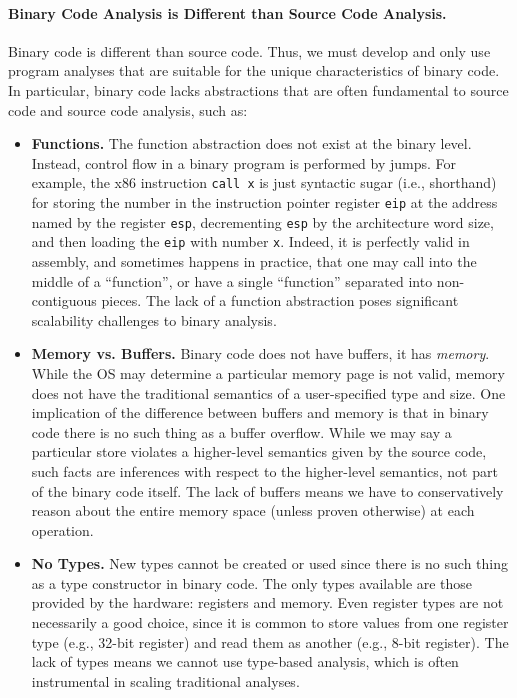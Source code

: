 \paragraph{Binary Code Analysis is Different than Source Code Analysis.}
Binary code is different than source code. Thus, we must develop and
only use program analyses that are suitable for the unique
characteristics of binary code.  In particular, binary code lacks
abstractions that are often fundamental to source code and source code
analysis, such as:
\begin{itemize}\squish
\item {\bf Functions.} The function abstraction does not exist at the
  binary level.  Instead, control flow in a binary program is
  performed by jumps. For example, the x86 instruction {\tt call x} is
  just syntactic sugar (i.e., shorthand) for storing the number in the
  instruction pointer register {\tt eip} at the address named by the
  register {\tt esp}, decrementing {\tt esp} by the architecture word
  size, and then loading the {\tt eip} with number {\tt x}. Indeed, it
  is perfectly valid in assembly, and sometimes happens in practice,
  that one may call into the middle of a ``function'', or have a
  single ``function'' separated into non-contiguous pieces. The lack
  of a function abstraction poses significant scalability challenges
  to binary analysis.

\item {\bf Memory vs. Buffers.} Binary code does not have buffers, it
  has \emph{memory}.  While the OS may determine a particular memory
  page is not valid, memory does not have the traditional semantics of
  a user-specified type and size. One implication of the difference
  between buffers and memory is that in binary code there is no such
  thing as a buffer overflow. While we may say a particular store
  violates a higher-level semantics given by the source code, such
  facts are inferences with respect to the higher-level semantics, not
  part of the binary code itself. The lack of buffers means we have to
  conservatively reason about the entire memory space (unless proven
  otherwise) at each operation.

\item {\bf No Types.} New types cannot be created or used since there
  is no such thing as a type constructor in binary code. The only
  types available are those provided by the hardware: registers and
  memory.  Even register types are not necessarily a good choice,
  since it is common to store values from one register type (e.g.,
  32-bit register) and read them as another (e.g., 8-bit
  register). The lack of types means we cannot use type-based
  analysis, which is often instrumental in scaling traditional
  analyses.

\end{itemize}


